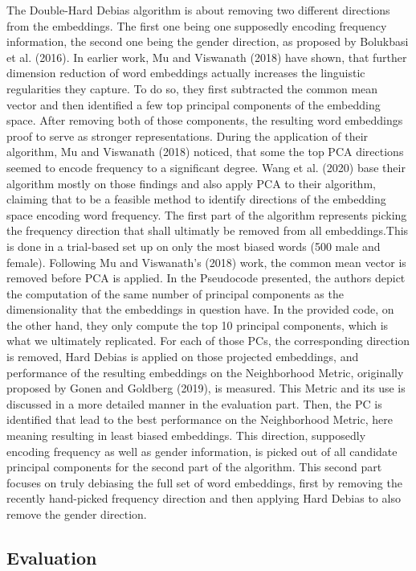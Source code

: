 \documentclass[
  english,
  man,floatsintext]{apa6}
\begin{document}
The Double-Hard Debias algorithm is about removing two different directions from the embeddings. The first one being one supposedly encoding frequency information, the second one being the gender direction, as proposed by Bolukbasi et al. (2016).
In earlier work, Mu and Viswanath (2018) have shown, that further dimension reduction of word embeddings actually increases the linguistic regularities they capture. To do so, they first subtracted the common mean vector and then identified a few top principal components of the embedding space. After removing both of those components, the resulting word embeddings proof to serve as stronger representations. During the application of their algorithm, Mu and Viswanath (2018) noticed, that some the top PCA directions seemed to encode frequency to a significant degree.
Wang et al. (2020) base their algorithm mostly on those findings and also apply PCA to their algorithm, claiming that to be a feasible method to identify directions of the embedding space encoding word frequency.
The first part of the algorithm represents picking the frequency direction that shall ultimatly be removed from all embeddings.This is done in a trial-based set up on only the most biased words (500 male and female). Following Mu and Viswanath's (2018) work, the common mean vector is removed before PCA is applied.
In the Pseudocode presented, the authors depict the computation of the same number of principal components as the dimensionality that the embeddings in question have. In the provided code, on the other hand, they only compute the top 10 principal components, which is what we ultimately replicated.
For each of those PCs, the corresponding direction is removed, Hard Debias is applied on those projected embeddings, and performance of the resulting embeddings on the Neighborhood Metric, originally proposed by Gonen and Goldberg (2019), is measured. This Metric and its use is discussed in a more detailed manner in the evaluation part.
Then, the PC is identified that lead to the best performance on the Neighborhood Metric, here meaning resulting in least biased embeddings.
This direction, supposedly encoding frequency as well as gender information, is picked out of all candidate principal components for the second part of the algorithm.
This second part focuses on truly debiasing the full set of word embeddings, first by removing the recently hand-picked frequency direction and then applying Hard Debias to also remove the gender direction.

\hypertarget{evaluation}{%
\subsection{Evaluation}\label{evaluation}}
\end{document}
